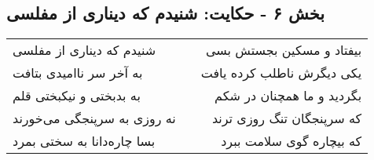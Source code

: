 \begin{center}
\section*{بخش ۶ - حکایت: شنیدم که دیناری از مفلسی}
\label{sec:006}
\begin{longtable}{l p{0.5cm} r}
شنیدم که دیناری از مفلسی
&&
بیفتاد و مسکین بجستش بسی
\\
به آخر سر ناامیدی بتافت
&&
یکی دیگرش ناطلب کرده یافت
\\
به بدبختی و نیکبختی قلم
&&
بگردید و ما همچنان در شکم
\\
نه روزی به سرپنجگی می‌خورند
&&
که سرپنجگان تنگ روزی ترند
\\
بسا چاره‌دانا به سختی بمرد
&&
که بیچاره گوی سلامت ببرد
\\
\end{longtable}
\end{center}

